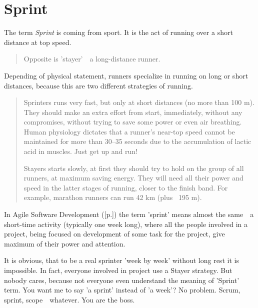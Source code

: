 \section{Sprint}
\label{sec:Sprint}

The term \emph{Sprint} is coming from sport. It is the act of running over a short distance at top speed.

\begin{quote}
Opposite is 'stayer'~\textemdash~a long-distance runner.\end{quote} 

Depending of physical statement, runners specialize in running on long or short distances, because this are two different strategies of running.

\begin{quote}
Sprinters runs very fast, but only at short distances (no more than 100 m). They should make an extra effort from start, immediately, without any compromises, without trying to save some power or even air breathing. Human physiology dictates that a runner's near-top speed cannot be maintained for more than 30–35 seconds due to the accumulation of lactic acid in muscles. Just get up and run!

Stayers starts slowly, at first they should try to hold on the group of all runners, at maximum saving energy. They will need all their power and speed in the latter stages of running, closer to the finish band. For example, marathon runners can run 42 km (plus ~195 m).                                                                                                                                                                                                                                                   \end{quote} 

In Agile Software Development ([p.\pageref{sec:Agile Software Development}]) the term 'sprint' means almost the same~\textemdash~a short-time activity (typically one week long), where all the people involved in a project, being focused on development of some task for the project, give maximum of their power and attention.

It is obvious, that to be a real sprinter 'week by week' without long rest it is impossible. In fact, everyone involved in project use a Stayer strategy. But nobody cares, because not everyone even understand the meaning of 'Sprint' term. You want me to say 'a sprint' instead of 'a week'? No problem. Scrum, sprint, scope~\textemdash~whatever. You are the boss.

